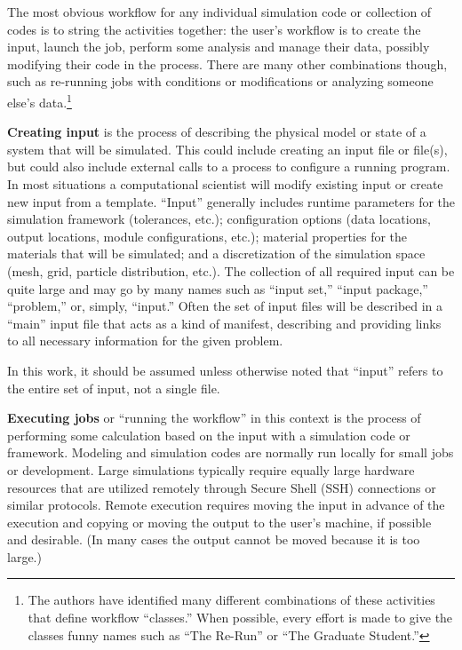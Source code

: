 The most obvious workflow for any individual simulation code or
collection of codes is to string the activities together: the user's
workflow is to create the input, launch the job, perform some analysis
and manage their data, possibly modifying their code in the process.
There are many other combinations though, such as re-running jobs with
conditions or modifications or analyzing someone else's data.\footnote{The
authors have identified many different combinations of these activities that
define workflow ``classes.'' When possible, every effort is made to give the
classes funny names such as ``The Re-Run'' or ``The Graduate Student.''}

\textbf{Creating input} is the process of describing the physical model
or state of a system that will be simulated. This could include creating
an input file or file(s), but could also include external calls to a
process to configure a running program. In most situations a
computational scientist will modify existing input or create new input
from a template. ``Input'' generally includes runtime parameters for the
simulation framework (tolerances, etc.); configuration options (data
locations, output locations, module configurations, etc.); material
properties for the materials that will be simulated; and a
discretization of the simulation space (mesh, grid, particle
distribution, etc.). The collection of all required input can be quite
large and may go by many names such as ``input set,'' ``input package,''
``problem,'' or, simply, ``input.'' Often the set of input files will be
described in a ``main'' input file that acts as a kind of manifest,
describing and providing links to all necessary information for the
given problem.

In this work, it should be assumed unless otherwise noted that ``input''
refers to the entire set of input, not a single file.

\textbf{Executing jobs} or ``running the workflow'' in this context is
the process of performing some calculation based on the input with a
simulation code or framework. Modeling and simulation codes are normally
run locally for small jobs or development. Large simulations typically
require equally large hardware resources that are utilized remotely
through Secure Shell (SSH) connections or similar protocols. Remote
execution requires moving the input in advance of the execution and
copying or moving the output to the user's machine, if possible and
desirable. (In many cases the output cannot be moved because it is too
large.)


